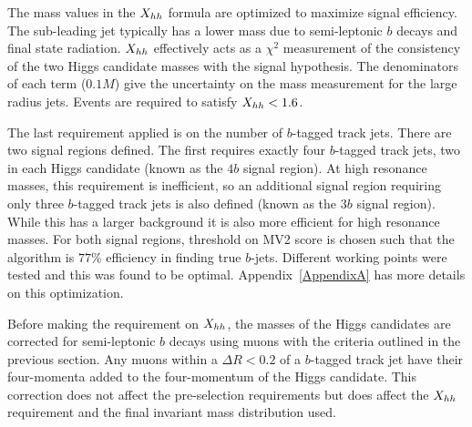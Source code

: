 The mass values in the $X_{hh}$ formula are optimized to maximize signal efficiency. The sub-leading jet typically has a lower mass due to semi-leptonic $b$ decays and final state radiation. $X_{hh}$ effectively acts as a $\chi^2$ measurement of the consistency of the two Higgs candidate masses with the signal hypothesis. The denominators of each term ($0.1M$) give the uncertainty on the mass measurement for the large radius jets. Events are required to satisfy $X_{hh} < 1.6$. 

The last requirement applied is on the number of $b$-tagged track jets. There are two signal regions defined. The first requires exactly four $b$-tagged track jets, two in each Higgs candidate (known as the $4b$ signal region). At high resonance masses, this requirement is inefficient, so an additional signal region requiring only three $b$-tagged track jets is also defined (known as the $3b$ signal region). While this has a larger background it is also more efficient for high resonance masses. For both signal regions, threshold on MV2 score is chosen such that the algorithm is $77\%$ efficiency in finding true $b$-jets. Different working points were tested and this was found to be optimal. Appendix~\ref{AppendixA} has more details on this optimization. 

Before making the requirement on $X_{hh}$, the masses of the Higgs candidates are corrected for semi-leptonic $b$ decays using muons with the criteria outlined in the previous section. Any muons within a $\Delta R < 0.2$ of a $b$-tagged track jet have their four-momenta added to the four-momentum of the Higgs candidate. This correction does not affect the pre-selection requirements but does affect the $X_{hh}$ requirement and the final invariant mass distribution used. 

